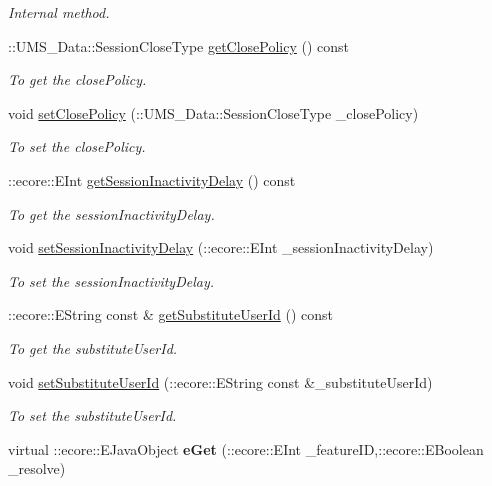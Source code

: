 \begin{DoxyCompactItemize}
\begin{DoxyCompactList}\small\item\em Internal method. \item\end{DoxyCompactList}\item 
::UMS\_\-Data::SessionCloseType \hyperlink{classUMS__Data_1_1ConnectOptions_a87a22a21277a68065392aa8cad4b177d}{getClosePolicy} () const 
\begin{DoxyCompactList}\small\item\em To get the closePolicy. \item\end{DoxyCompactList}\item 
void \hyperlink{classUMS__Data_1_1ConnectOptions_abefafa5f2e665dac1df5bc4fa2d1ad49}{setClosePolicy} (::UMS\_\-Data::SessionCloseType \_\-closePolicy)
\begin{DoxyCompactList}\small\item\em To set the closePolicy. \item\end{DoxyCompactList}\item 
::ecore::EInt \hyperlink{classUMS__Data_1_1ConnectOptions_a376183d4fd7052a39b4a4b7fa1c9cf3b}{getSessionInactivityDelay} () const 
\begin{DoxyCompactList}\small\item\em To get the sessionInactivityDelay. \item\end{DoxyCompactList}\item 
void \hyperlink{classUMS__Data_1_1ConnectOptions_a118e63f296ea5583443ee55aeedf7ccf}{setSessionInactivityDelay} (::ecore::EInt \_\-sessionInactivityDelay)
\begin{DoxyCompactList}\small\item\em To set the sessionInactivityDelay. \item\end{DoxyCompactList}\item 
::ecore::EString const \& \hyperlink{classUMS__Data_1_1ConnectOptions_a9ebe62c25154df5475d1593b326d883c}{getSubstituteUserId} () const 
\begin{DoxyCompactList}\small\item\em To get the substituteUserId. \item\end{DoxyCompactList}\item 
void \hyperlink{classUMS__Data_1_1ConnectOptions_a051f6104831c3de717e877189ba150d6}{setSubstituteUserId} (::ecore::EString const \&\_\-substituteUserId)
\begin{DoxyCompactList}\small\item\em To set the substituteUserId. \item\end{DoxyCompactList}\item 
\hypertarget{classUMS__Data_1_1ConnectOptions_a29873f88e32c79a086df0fff720fa847}{
virtual ::ecore::EJavaObject {\bfseries eGet} (::ecore::EInt \_\-featureID,::ecore::EBoolean \_\-resolve)}
\label{classUMS__Data_1_1ConnectOptions_a29873f88e32c79a086df0fff720fa847}


\end{DoxyCompactItemize}
